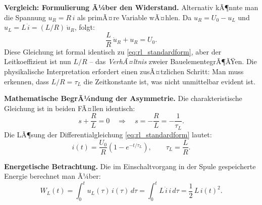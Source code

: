 ﻿\documentclass[12pt, a4paper]{article}
\begin{document}
	\textbf{Vergleich: Formulierung Ã¼ber den Widerstand.}
	Alternativ kÃ¶nnte man die Spannung $u_R = R\,i$ als primÃ¤re Variable wÃ¤hlen.
	Da $u_R = U_0 - u_L$ und $u_L = L\,\dot{i} = (L/R)\,\dot{u}_R$, folgt:
	\begin{equation}
		\frac{L}{R}\,\dot{u}_R + u_R = U_0.
		\label{eq:rl_widerstand}
	\end{equation}
	Diese Gleichung ist formal identisch zu \eqref{eq:rl_standardform}, aber
	der Leitkoeffizient ist nun $L/R$ -- das \emph{VerhÃ¤ltnis} zweier
	BauelementegrÃ¶ÃŸen. Die physikalische Interpretation erfordert einen
	zusÃ¤tzlichen Schritt: Man muss erkennen, dass $L/R = \tau_L$ die
	Zeitkonstante ist, was nicht unmittelbar evident ist.
	
	\textbf{Mathematische BegrÃ¼ndung der Asymmetrie.}
	Die charakteristische Gleichung ist in beiden FÃ¤llen identisch:
	\begin{equation}
		s + \frac{R}{L} = 0 \quad \Longrightarrow \quad s = -\frac{R}{L} = -\frac{1}{\tau_L}.
	\end{equation}
	Die LÃ¶sung der Differentialgleichung \eqref{eq:rl_standardform} lautet:
	\begin{equation}
		i(t) = \frac{U_0}{R}\left(1 - e^{-t/\tau_L}\right),
		\qquad \tau_L = \frac{L}{R}.
	\end{equation}
	
	\textbf{Energetische Betrachtung.}
	Die im Einschaltvorgang in der Spule gespeicherte Energie berechnet man Ã¼ber:
	\begin{equation}
		W_L(t) = \int_0^t u_L(\tau)\,i(\tau)\,d\tau
		= \int_0^t L\,\dot{i}\,i\,d\tau
		= \frac{1}{2}\,L\,i(t)^2.
	\end{equation}
	
\end{document}
